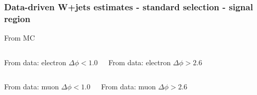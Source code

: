 \documentclass[red,compress,xcolor=table]{beamer}
\begin{document}
\begin{frame}
  \frametitle{Data-driven W+jets estimates - standard selection - signal region}

\vspace*{-0.5cm}
\begin{block}{\scriptsize From MC}
\begin{center}
    {\tiny
      
    }
\end{center}
  \end{block}

\vspace*{-0.2cm}
\begin{columns}
  \begin{block}{\scriptsize From data: electron $\Delta\phi<1.0$}
    {\tiny
      
    }
  \end{block}
  \begin{block}{\scriptsize From data: electron  $\Delta\phi>2.6$}
    {\tiny
      
    }
  \end{block}
\end{columns}
\begin{columns}
  \begin{block}{\scriptsize From data: muon  $\Delta\phi<1.0$}
    {\tiny
      
    }
  \end{block}
  \begin{block}{\scriptsize From data: muon $\Delta\phi>2.6$}
    {\tiny
      
    }
  \end{block}
\end{columns}


\end{frame}
\end{document}
